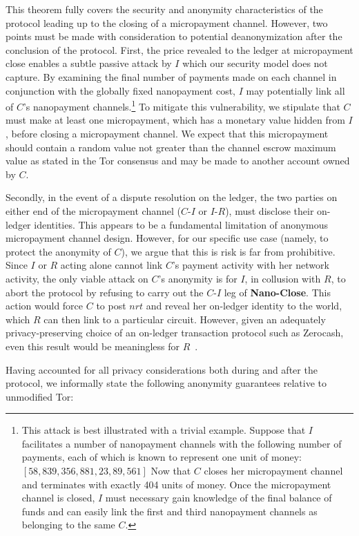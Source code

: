 This theorem fully covers the security and anonymity characteristics of the
protocol leading up to the closing of a micropayment channel. However, two
points must be made with consideration to potential deanonymization after the
conclusion of the protocol. First, the price revealed to the ledger at
micropayment close enables a subtle passive attack by $I$ which our security
model does not capture. By examining the final number of payments made on each
channel in conjunction with the globally fixed nanopayment cost, $I$ may
potentially link all of $C$'s nanopayment channels.\footnote{This attack is best
  illustrated with a trivial example. Suppose that $I$ facilitates a number of
  nanopayment channels with the following number of payments, each of which is
  known to represent one unit of money: $[58, 839, 356, 881, 23, 89, 561]$ Now
  that $C$ closes her micropayment channel and terminates with exactly 404 units
  of money. Once the micropayment channel is closed, $I$ must necessary gain
  knowledge of the final balance of funds and can easily link the first and
  third nanopayment channels as belonging to the same $C$.} To mitigate this
vulnerability, we stipulate that $C$ must make at least one micropayment, which
has a monetary value hidden from $I$, before closing a micropayment channel. We
expect that this micropayment should contain a random value not greater than the
channel escrow maximum value as stated in the Tor consensus and may be made to
another account owned by $C$.

Secondly, in the event of a dispute resolution on the ledger, the two parties on
either end of the micropayment channel ($C$-$I$ or $I$-$R$), must disclose their
on-ledger identities. This appears to be a fundamental limitation of anonymous
micropayment channel design. However, for our specific use case (namely, to
protect the anonymity of $C$), we argue that this is risk is far from
prohibitive. Since $I$ or $R$ acting alone cannot link $C$'s payment activity
with her network activity, the only viable attack on $C$'s anonymity is for $I$,
in collusion with $R$, to abort the protocol by refusing to carry out the
$C$-$I$ leg of \textbf{Nano-Close}. This action would force $C$ to post $nrt$
and reveal her on-ledger identity to the world, which $R$ can then link to a
particular circuit. However, given an adequately privacy-preserving choice of an
on-ledger transaction protocol such as Zerocash, even this result would be
meaningless for $R$~\cite{sasson2014zerocash}.

Having accounted for all privacy considerations both during and after the
protocol, we informally state the following anonymity guarantees relative to
unmodified Tor:

